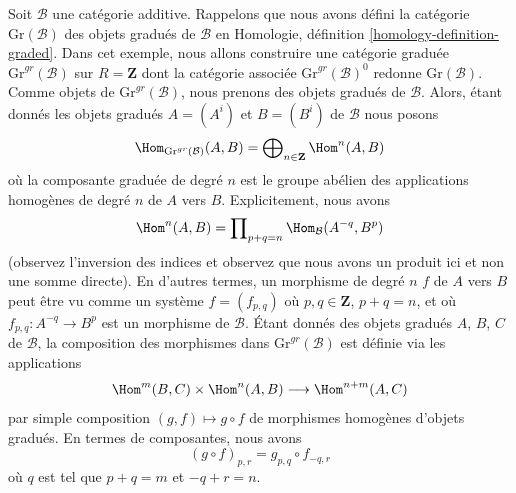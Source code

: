 \begin{example}
\label{example-graded-category-graded-objects}
Soit $\mathcal{B}$ une catégorie additive. Rappelons que nous avons défini
la catégorie $\text{Gr}(\mathcal{B})$ des objets gradués de $\mathcal{B}$ en
Homologie, définition \ref{homology-definition-graded}. Dans cet
exemple, nous allons construire une catégorie graduée
$\text{Gr}^{gr}(\mathcal{B})$ sur $R = \mathbf{Z}$ dont la
catégorie associée $\text{Gr}^{gr}(\mathcal{B})^0$ redonne
$\text{Gr}(\mathcal{B})$. Comme objets de
$\text{Gr}^{gr}(\mathcal{B})$, nous prenons des
objets gradués de $\mathcal{B}$. Alors, étant donnés les objets gradués $A =
(A^i)$ et $B = (B^i)$ de $\mathcal{B}$ nous posons
$$
\Hom_{\text{Gr}^{gr}(\mathcal{B})}(A, B) =
\bigoplus\nolimits_{n \in \mathbf{Z}} \Hom^n(A, B)
$$
où la composante graduée de degré $n$ est le groupe abélien des applications
homogènes de degré $n$ de $A$ vers $B$. Explicitement, nous avons
$$
\Hom^n(A, B) = \prod\nolimits_{p + q = n} \Hom_\mathcal{B}(A^{-q}, B^p)
$$
(observez l'inversion des indices et observez que nous avons un produit ici et non
une somme directe). En d'autres termes, un morphisme de degré $n$
$f$ de $A$ vers $B$ peut être vu comme un système $f = (f_{p, q})$ où
$p, q \in \mathbf{Z}$, $p + q = n$, et où $f_{p, q} :
A^{-q} \to B^p$ est un morphisme de $\mathcal{B}$. Étant donnés
des objets gradués $A$, $B$, $C$ de $\mathcal{B}$, la
composition des morphismes dans $\text{Gr}^{gr}(\mathcal{B})$ est définie via les
applications
$$
\Hom^m(B, C) \times \Hom^n(A, B) \longrightarrow \Hom^{n + m}(A, C)
$$
par simple composition $(g, f) \mapsto g \circ f$ de morphismes
homogènes d'objets gradués. En termes de composantes, nous avons
$$
(g \circ f)_{p, r} = g_{p, q} \circ f_{-q, r}
$$
où $q$ est tel que $p + q = m$ et $-q + r = n$.
\end{example}

